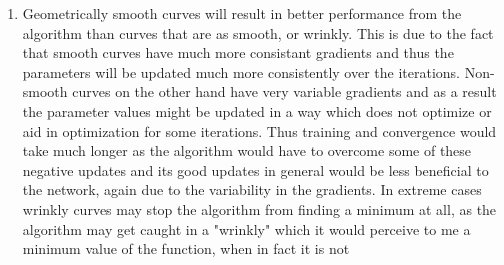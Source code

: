 \documentclass{article}
\begin{document}
\begin{enumerate}
\begin{enumerate}[label=\arabic*)]
\begin{enumerate}[label=\alph*)]
						\item Geometrically smooth curves will result in better performance from the algorithm than curves that are as smooth, or wrinkly. This is due to the fact that smooth curves have much more consistant gradients and thus the parameters will be updated much more consistently over the iterations. Non-smooth curves on the other hand have very variable gradients and as a result the parameter values might be updated in a way which does not optimize or aid in optimization for some iterations. Thus training and convergence would take much longer as the algorithm would have to overcome some of these negative updates and its good updates in general would be less beneficial to the network, again due to the variability in the gradients. In extreme cases wrinkly curves may stop the algorithm from finding a minimum at all, as the algorithm may get caught in a "wrinkly" which it would perceive to me a minimum value of the function, when in fact it is not
					\end{enumerate}
			\end{enumerate}
		\end{enumerate}
\end{document}
